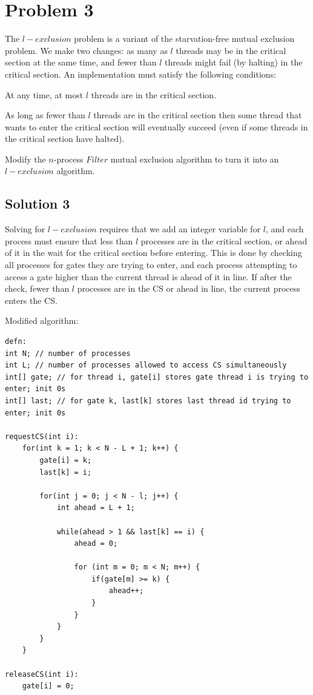 \documentclass{article}
\begin{document}
\pagebreak
\section{Problem 3}
The $l-exclusion$ problem is a variant of the starvation-free mutual exclusion problem. We make two changes: as many as $l$ threads may be in the critical section at the same time, and fewer than $l$ threads might fail (by halting) in the critical section. An implementation must satisfy the following conditions:

\begin{description}[font=\scshape\bfseries]
\item [$l-Exclusion$:] At any time, at most $l$ threads are in the critical section.
\item [$l-Starvation-Freedom$:] As long as fewer than $l$ threads are in the critical section then some thread that wants to enter the critical section will eventually succeed (even if some threads in the critical section have halted).
\end{description}

Modify the $n$-process $Filter$ mutual exclusion algorithm to turn it into an $l-exclusion$ algorithm.

\subsection{Solution 3}
Solving for $l-exclusion$ requires that we add an integer variable for $l$, and each process must ensure that less than $l$ processes are in the critical section, or ahead of it in the wait for the critical section before entering. This is done by checking all processes for gates they are trying to enter, and each process attempting to access a gate higher than the current thread is ahead of it in line. If after the check, fewer than $l$ processes are in the CS or ahead in line, the current process enters the CS.

Modified algorithm:

\begin{lstlisting}
defn:
int N; // number of processes
int L; // number of processes allowed to access CS simultaneously
int[] gate; // for thread i, gate[i] stores gate thread i is trying to enter; init 0s
int[] last; // for gate k, last[k] stores last thread id trying to enter; init 0s

requestCS(int i):
	for(int k = 1; k < N - L + 1; k++) {
		gate[i] = k;
		last[k] = i;
		
		for(int j = 0; j < N - l; j++) {
			int ahead = L + 1;
			
			while(ahead > 1 && last[k] == i) {
				ahead = 0;
				
				for (int m = 0; m < N; m++) {
					if(gate[m] >= k) {
						ahead++;
					}
				}
			}
		}
	}
	
releaseCS(int i):
	gate[i] = 0;



\end{lstlisting}
\end{document}

